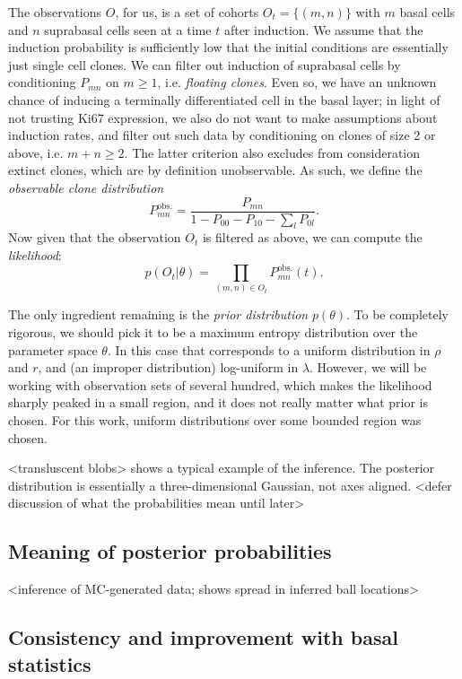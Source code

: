 \documentclass[10pt,UKenglish]{article}
\begin{document}
The observations $O$, for us, is a set of cohorts $O_t = \{(m,n)\}$ with $m$ basal cells and $n$ suprabasal cells seen at a time $t$ after induction. We assume that the induction probability is sufficiently low that the initial conditions are essentially just single cell clones. We can filter out induction of suprabasal cells by conditioning $P_{mn}$ on $m \ge 1$, i.e. \emph{floating clones}. Even so, we have an unknown chance of inducing a terminally differentiated cell in the basal layer; in light of not trusting Ki67 expression, we also do not want to make assumptions about induction rates, and filter out such data by conditioning on clones of size 2 or above, i.e. $m+n \ge 2$. The latter criterion also excludes from consideration extinct clones, which are by definition unobservable. As such, we define the \emph{observable clone distribution} $$P^\textrm{obs.}_{mn} = \frac{P_{mn}}{1 - P_{00} - P_{10} - \sum_l P_{0l}}.$$ Now given that the observation $O_t$ is filtered as above, we can compute the \emph{likelihood}: $$p(O_t|\theta) = \prod_{(m,n) \in O_t} P^\textrm{obs.}_{mn}(t).$$

The only ingredient remaining is the \emph{prior distribution} $p(\theta)$. To be completely rigorous, we should pick it to be a maximum entropy distribution over the parameter space $\theta$. In this case that corresponds to a uniform distribution in $\rho$ and $r$, and (an improper distribution) log-uniform in $\lambda$. However, we will be working with observation sets of several hundred, which makes the likelihood sharply peaked in a small region, and it does not really matter what prior is chosen. For this work, uniform distributions over some bounded region was chosen.

<transluscent blobs> shows a typical example of the inference. The posterior distribution is essentially a three-dimensional Gaussian, not axes aligned. <defer discussion of what the probabilities mean until later>

\subsection{Meaning of posterior probabilities}

<inference of MC-generated data; shows spread in inferred ball locations>

\subsection{Consistency and improvement with basal statistics}
\end{document}
